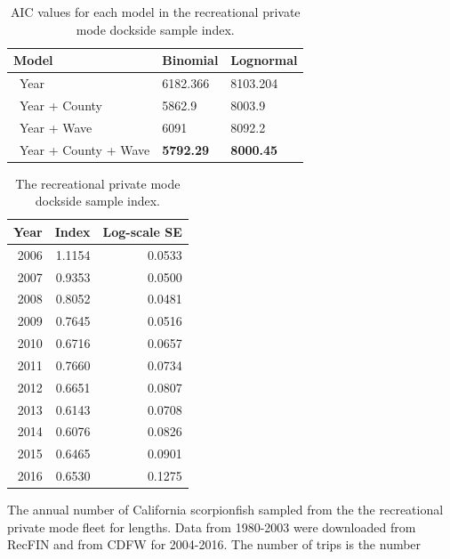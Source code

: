 \documentclass[12pt,]{article}
\begin{document}
\begin{table}[ht]
\centering
\caption{AIC values for each model in the
                                          recreational private mode dockside sample 
                                          index.} 
\label{tab:Fleet4_RecPR_dockside_aic}
\begin{tabular}{lll}
  \hline
Model & Binomial & Lognormal \\ 
  \hline
~Year & 6182.366 & 8103.204 \\ 
  ~Year + County & 5862.9 & 8003.9 \\ 
  ~Year + Wave & 6091 & 8092.2 \\ 
  ~Year + County + Wave & \textbf{5792.29} & \textbf{8000.45} \\ 
   \hline
\end{tabular}
\end{table}\begin{table}[ht]
\centering
\caption{The recreational private mode 
                                            dockside sample index.} 
\label{tab:Fleet4_RecPR_dockside_index}
\begin{tabular}{rrr}
  \hline
Year & Index & Log-scale SE \\ 
  \hline
 2006 & 1.1154 & 0.0533 \\ 
   2007 & 0.9353 & 0.0500 \\ 
   2008 & 0.8052 & 0.0481 \\ 
   2009 & 0.7645 & 0.0516 \\ 
   2010 & 0.6716 & 0.0657 \\ 
   2011 & 0.7660 & 0.0734 \\ 
   2012 & 0.6651 & 0.0807 \\ 
   2013 & 0.6143 & 0.0708 \\ 
   2014 & 0.6076 & 0.0826 \\ 
   2015 & 0.6465 & 0.0901 \\ 
   2016 & 0.6530 & 0.1275 \\ 
   \hline
\end{tabular}
\end{table}\begin{table}[ht]
\centering
\caption{The annual number of California scorpionfish 
                                              sampled from the the recreational private 
                                              mode fleet for lengths. Data from 1980-2003
                                            were downloaded from RecFIN and from CDFW for
                                            2004-2016. The number of trips is the number
}
\end{table}
\end{document}
